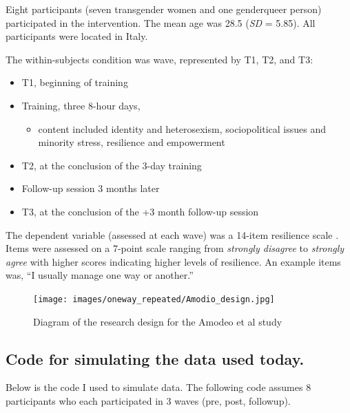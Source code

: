 \documentclass[
  11pt,
]{book}
\providecommand{\tightlist}{%
  \setlength{\itemsep}{0pt}\setlength{\parskip}{0pt}}
\begin{document}
Eight participants (seven transgender women and one genderqueer person) participated in the intervention. The mean age was 28.5 (\emph{SD} = 5.85). All participants were located in Italy.

The within-subjects condition was wave, represented by T1, T2, and T3:

\begin{itemize}
\tightlist
\item
  T1, beginning of training
\item
  Training, three 8-hour days,

  \begin{itemize}
  \tightlist
  \item
    content included identity and heterosexism, sociopolitical issues and minority stress, resilience and empowerment
  \end{itemize}
\item
  T2, at the conclusion of the 3-day training
\item
  Follow-up session 3 months later
\item
  T3, at the conclusion of the +3 month follow-up session
\end{itemize}

The dependent variable (assessed at each wave) was a 14-item resilience scale \citep{wagnild_development_1993}. Items were assessed on a 7-point scale ranging from \emph{strongly disagree} to \emph{strongly agree} with higher scores indicating higher levels of resilience. An example items was, ``I usually manage one way or another.''

\begin{figure}
\hypertarget{id}{%
\centering
\texttt{[image: images/oneway\_repeated/Amodio\_design.jpg]}
\caption{Diagram of the research design for the Amodeo et al study}\label{id}
}
\end{figure}

\hypertarget{code-for-simulating-the-data-used-today.}{%
\subsection{Code for simulating the data used today.}\label{code-for-simulating-the-data-used-today.}}

Below is the code I used to simulate data. The following code assumes 8 participants who each participated in 3 waves (pre, post, followup).
\end{document}
